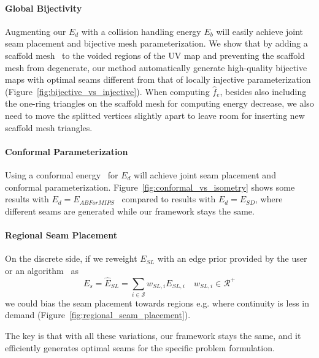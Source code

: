 \paragraph{Global Bijectivity}  \minchen{[DOING]} Augmenting our $E_d$ with a collision handling energy $E_b$ will easily achieve joint seam placement and bijective mesh parameterization. We show that by adding a scaffold mesh~\cite{Jiang2017Simplicial} to the voided regions of the UV map and preventing the scaffold mesh from degenerate, our method automatically generate high-quality bijective maps with optimal seams different from that of locally injective parameterization (Figure~\ref{fig:bijective_vs_injective}). When computing $\hat{f}_e$, besides also including the one-ring triangles on the scaffold mesh for computing energy decrease, we also need to move the splitted vertices slightly apart to leave room for inserting new scaffold mesh triangles.

\paragraph{Conformal Parameterization} \minchen{[TODO]} Using a conformal energy~\cite{Hormann2000MIPS,Sheffer2005ABFPP} for $E_d$ will achieve joint seam placement and conformal parameterization. Figure~\ref{fig:conformal_vs_isometry} shows some results with $E_d = E_{ABForMIPS}$~\cite{} compared to results with $E_d = E_{SD}$, where different seams are generated while our framework stays the same.

\paragraph{Regional Seam Placement} \minchen{[TODO]} On the discrete side, if we reweight $E_{SL}$ with an edge prior provided by the user or an algorithm~\cite{} as
\[ E_s = \hat{E}_{SL} = \sum_{i\in\mathcal{S}} w_{SL,i} E_{SL,i} \quad w_{SL,i} \in \mathcal{R^+} \]
we could bias the seam placement towards regions e.g. where continuity is less in demand (Figure~\ref{fig:regional_seam_placement}).


The key is that with all these variations, our framework stays the same, and it efficiently generates optimal seams for the specific problem formulation.